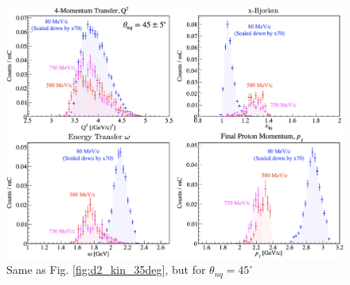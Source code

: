 \documentclass[aps, prl]{revtex4-2}  %
\begin{document}
\begin{figure}[!h]
\includegraphics[scale=0.17]{d2_kin_thnq45.png}
\caption{Same as Fig. \ref{fig:d2_kin_35deg}, but for $\theta_{nq}=45^{\circ}$}
\label{fig:d2_kin_45deg}
\end{figure}
\end{document}
